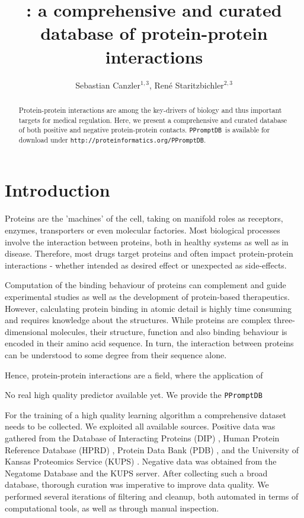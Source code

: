\documentclass{article}
\title{\db: a comprehensive and curated database of protein-protein interactions}
\author{ Sebastian Canzler$^{1,3}$, Ren\'{e} Staritzbichler$^{2,3}$}
\date{}
\newcommand{\db}{\texttt{PPromptDB}}
\newcommand{\url}[1]{\texttt{http://\small #1}}
\newcommand{\server}{ \url{proteinformatics.org/\db}}
\begin{document}
\maketitle


\begin{abstract}
  Protein-protein interactions are among the key-drivers of biology and thus important targets for medical regulation. 
  Here, we present a comprehensive and curated database of both positive and negative protein-protein contacts.
  \db\ is available for download under \server.
  
  
\end{abstract}



\section*{Introduction}
  Proteins are the 'machines' of the cell, taking on manifold roles as receptors, enzymes, transporters or even molecular factories.
  Most biological processes involve the interaction between proteins, both in healthy systems as well as in disease.
  Therefore, most drugs target proteins and often impact protein-protein interactions - whether intended as desired effect or unexpected as side-effects.

  
  Computation of the binding behaviour of proteins can complement and guide experimental studies as well as the development of protein-based therapeutics.
  However, calculating protein binding in atomic detail is highly time consuming and requires  knowledge about the structures.
  While proteins are complex three-dimensional molecules, their structure, function and also binding behaviour is encoded in their amino acid sequence.
  In turn, the interaction between proteins can be understood to some degree from their sequence alone.

  Hence, protein-protein interactions are a field, where the application of

  No real high quality predictor available yet.
  We provide the \db\ 


  
  For the training of a high quality learning algorithm a comprehensive dataset needs to be collected.
  We exploited all available sources.
  Positive data was gathered from the
  Database of Interacting Proteins (DIP)
  \cite{Salwinski:2004},
  Human Protein Reference Database (HPRD)
  \cite{Keshava_Prasad:2009},
  Protein  Data Bank (PDB) \cite{Berman:2000}, and the University of Kansas Proteomics Service (KUPS) \cite{Chen:2011}.
  Negative data was obtained from the Negatome Database \cite{Blohm:2014}  and the KUPS server.
  After collecting such a broad database, thorough curation was imperative to improve data quality.
  We performed several iterations of filtering and cleanup, both automated in terms of computational tools, as well as through manual inspection.
  
\end{document}
